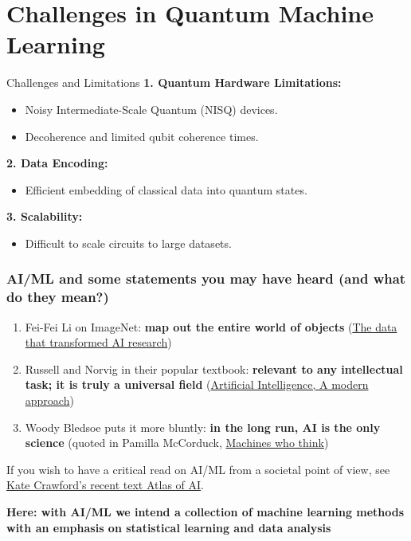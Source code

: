 \documentclass{beamer}
\begin{document}
\section{Challenges in Quantum Machine Learning}
\begin{frame}{Challenges and Limitations}
\textbf{1. Quantum Hardware Limitations:}
\begin{itemize}
    \item Noisy Intermediate-Scale Quantum (NISQ) devices.
    \item Decoherence and limited qubit coherence times.
\end{itemize}

\textbf{2. Data Encoding:}
\begin{itemize}
    \item Efficient embedding of classical data into quantum states.
\end{itemize}

\textbf{3. Scalability:}
\begin{itemize}
    \item Difficult to scale circuits to large datasets.
\end{itemize}
\end{frame}



\begin{frame}
\frametitle{AI/ML and some statements you may have heard (and what do they mean?)}



\begin{enumerate}
\item Fei-Fei Li on ImageNet: \textbf{map out the entire world of objects} (\href{{https://cacm.acm.org/news/219702-the-data-that-transformed-ai-research-and-possibly-the-world/fulltext}}{The data that transformed AI research})

\item Russell and Norvig in their popular textbook: \textbf{relevant to any intellectual task; it is truly a universal field} (\href{{http://aima.cs.berkeley.edu/}}{Artificial Intelligence, A modern approach})

\item Woody Bledsoe puts it more bluntly: \textbf{in the long run, AI is the only science} (quoted in Pamilla McCorduck, \href{{https://www.pamelamccorduck.com/machines-who-think}}{Machines who think})
\end{enumerate}

\noindent
If you wish to have a critical read on AI/ML from a societal point of view, see \href{{https://www.katecrawford.net/}}{Kate Crawford's recent text Atlas of AI}.

\textbf{Here: with AI/ML we intend a collection of machine learning methods with an emphasis on statistical learning and data analysis}
\end{frame}
\end{document}
